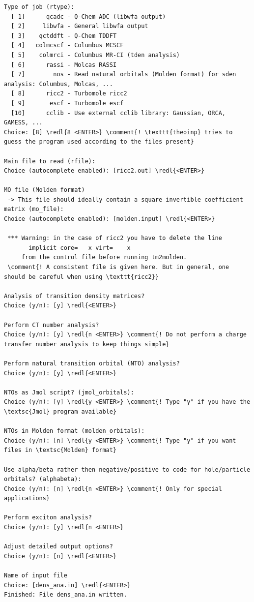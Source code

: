 \documentclass[DIV=12,headings=normal]{scrartcl}
\newcommand\Cline[2][red]{{\sbox\MBox{#2}%
  \rlap{\usebox\MBox}\color{#1}\rule[-1.2\dp\MBox]{\wd\MBox}{0.5pt}}}
\newcommand{\comment}[1]{\textcolor{blue}{#1}}
\newcommand{\redl}[1]{\Cline{\textcolor{red}{#1}}}
\newcounter{number}
\begin{document}
\scriptsize
\begin{Verbatim}[commandchars=\\\{\}]
Type of job (rtype):
  [ 1]      qcadc - Q-Chem ADC (libwfa output)
  [ 2]     libwfa - General libwfa output
  [ 3]    qctddft - Q-Chem TDDFT
  [ 4]   colmcscf - Columbus MCSCF
  [ 5]    colmrci - Columbus MR-CI (tden analysis)
  [ 6]      rassi - Molcas RASSI
  [ 7]        nos - Read natural orbitals (Molden format) for sden analysis: Columbus, Molcas, ...
  [ 8]      ricc2 - Turbomole ricc2
  [ 9]       escf - Turbomole escf
  [10]      cclib - Use external cclib library: Gaussian, ORCA, GAMESS, ...
Choice: [8] \redl{8 <ENTER>} \comment{! \texttt{theoinp} tries to guess the program used according to the files present}

Main file to read (rfile):
Choice (autocomplete enabled): [ricc2.out] \redl{<ENTER>}

MO file (Molden format)
 -> This file should ideally contain a square invertible coefficient matrix (mo_file):
Choice (autocomplete enabled): [molden.input] \redl{<ENTER>}

 *** Warning: in the case of ricc2 you have to delete the line
       implicit core=   x virt=    x
     from the control file before running tm2molden.
 \comment{! A consistent file is given here. But in general, one should be careful when using \texttt{ricc2}}

Analysis of transition density matrices?
Choice (y/n): [y] \redl{<ENTER>}

Perform CT number analysis?
Choice (y/n): [y] \redl{n <ENTER>} \comment{! Do not perform a charge transfer number analysis to keep things simple}

Perform natural transition orbital (NTO) analysis?
Choice (y/n): [y] \redl{<ENTER>}

NTOs as Jmol script? (jmol_orbitals):
Choice (y/n): [y] \redl{y <ENTER>} \comment{! Type "y" if you have the \textsc{Jmol} program available}

NTOs in Molden format (molden_orbitals):
Choice (y/n): [n] \redl{y <ENTER>} \comment{! Type "y" if you want files in \textsc{Molden} format}

Use alpha/beta rather then negative/positive to code for hole/particle orbitals? (alphabeta):
Choice (y/n): [n] \redl{n <ENTER>} \comment{! Only for special applications}

Perform exciton analysis?
Choice (y/n): [y] \redl{n <ENTER>}

Adjust detailed output options?
Choice (y/n): [n] \redl{<ENTER>}

Name of input file
Choice: [dens_ana.in] \redl{<ENTER>}
Finished: File dens_ana.in written.
\end{Verbatim}
\normalsize
\end{document}
